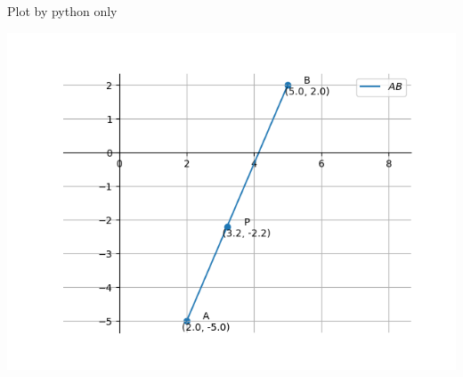 \documentclass{beamer}
\begin{document}
\begin{frame}{Plot by python only}
	\begin{center}
		\includegraphics[width=0.8\columnwidth]{figs/fig_2.png}
	\end{center}
\end{frame}
\end{document}
